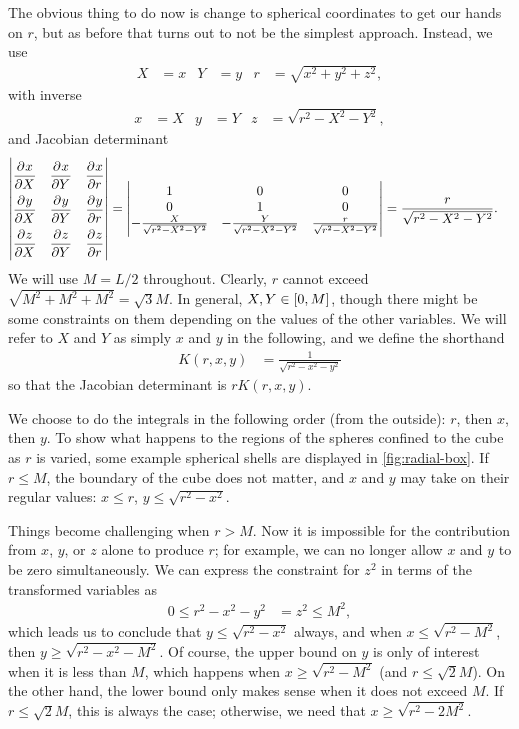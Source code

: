 The obvious thing to do now is change to spherical coordinates to get our hands on $r$, but as before that turns out to not be the simplest approach.
Instead, we use
\begin{align}
	X
	&= x
	&
	Y
	&= y
	&
	r
	&= \sqrt{x^2 + y^2 + z^2},
\end{align}
with inverse
\begin{align}
	x
	&= X
	&
	y
	&= Y
	&
	z
	&= \sqrt{r^2 - X^2 - Y^2},
\end{align}
and Jacobian determinant
\begin{align}
	\begin{vmatrix}
			\dpd{x}{X} & \dpd{x}{Y} & \dpd{x}{r} \\[3 mm]
			\dpd{y}{X} & \dpd{y}{Y} & \dpd{y}{r} \\[3 mm]
			\dpd{z}{X} & \dpd{z}{Y} & \dpd{z}{r}
		\end{vmatrix}
	&= \begin{vmatrix}
			1 & 0 & 0 \\
			0 & 1 & 0 \\
			-\frac{X}{\sqrt{r^2 - X^2 - Y^2}} & -\frac{Y}{\sqrt{r^2 - X^2 - Y^2}} & \frac{r}{\sqrt{r^2 - X^2 - Y^2}}
		\end{vmatrix}
	= \frac{r}{\sqrt{r^2 - X^2 - Y^2}}.
\end{align}
We will use $M = L / 2$ throughout.
Clearly, $r$ cannot exceed $\sqrt{M^2 + M^2 + M^2} = \sqrt{3} M$.
In general, $X, Y \in \intcc{0, M}$, though there might be some constraints on them depending on the values of the other variables.
We will refer to $X$ and $Y$ as simply $x$ and $y$ in the following, and we define the shorthand
\begin{align}
	K(r, x, y)
	&= \frac{1}{\sqrt{r^2 - x^2 - y^2}}
\end{align}
so that the Jacobian determinant is $r K(r, x, y)$.

We choose to do the integrals in the following order (from the outside): $r$, then $x$, then $y$.
To show what happens to the regions of the spheres confined to the cube as $r$ is varied, some example spherical shells are displayed in \cref{fig:radial-box}.
If $r \le M$, the boundary of the cube does not matter, and $x$ and $y$ may take on their regular values: $x \le r$, $y \le \sqrt{r^2 - x^2}$.

Things become challenging when $r > M$.
Now it is impossible for the contribution from $x$, $y$, or $z$ alone to produce $r$; for example, we can no longer allow $x$ and $y$ to be zero simultaneously.
We can express the constraint for $z^2$ in terms of the transformed variables as
\begin{align}
	0
	\le r^2 - x^2 - y^2
	&= z^2
	\le M^2,
\end{align}
which leads us to conclude that $y \le \sqrt{r^2 - x^2}$ always, and when $x \le \sqrt{r^2 - M^2}$, then $y \ge \sqrt{r^2 - x^2 - M^2}$.
Of course, the upper bound on $y$ is only of interest when it is less than $M$, which happens when $x \ge \sqrt{r^2 - M^2}$ (and $r \le \sqrt{2} M$).
On the other hand, the lower bound only makes sense when it does not exceed $M$.
If $r \le \sqrt{2} M$, this is always the case; otherwise, we need that $x \ge \sqrt{r^2 - 2 M^2}$.

